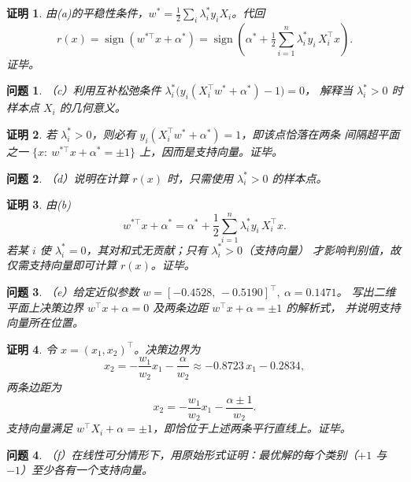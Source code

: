 \documentclass[11pt]{ctexart}
\newtheorem{problem}{问题}
\newtheorem*{solution}{证明}
\begin{document}
\begin{solution}
由(a)的平稳性条件，$w^{*}=\tfrac12\sum_i\lambda_i^{*} y_i X_i$。代回
\[
r(x)=\operatorname{sign}(w^{*\top}x+\alpha^{*})
=\operatorname{sign}\!\left(\alpha^{*}+\tfrac12\sum_{i=1}^n \lambda_i^{*} y_i\,X_i^\top x\right).
\]
证毕。
\end{solution}

\begin{problem}
（c）利用互补松弛条件 $\lambda_i^{*}\big(y_i(X_i^\top w^{*}+\alpha^{*})-1\big)=0$，
解释当 $\lambda_i^{*}>0$ 时样本点 $X_i$ 的几何意义。
\end{problem}

\begin{solution}
若 $\lambda_i^{*}>0$，则必有 $y_i(X_i^\top w^{*}+\alpha^{*})=1$，即该点恰落在两条
间隔超平面之一 $\{x:\ w^{*\top}x+\alpha^{*}=\pm 1\}$ 上，因而是支持向量。证毕。
\end{solution}

\begin{problem}
（d）说明在计算 $r(x)$ 时，只需使用 $\lambda_i^{*}>0$ 的样本点。
\end{problem}

\begin{solution}
由(b)
\[
w^{*\top}x+\alpha^{*}=\alpha^{*}+\frac12\sum_{i=1}^n\lambda_i^{*} y_i\,X_i^\top x.
\]
若某 $i$ 使 $\lambda_i^{*}=0$，其对和式无贡献；只有 $\lambda_i^{*}>0$（支持向量）
才影响判别值，故仅需支持向量即可计算 $r(x)$。证毕。
\end{solution}

\begin{problem}
（e）给定近似参数 $w=[-0.4528,\,-0.5190]^\top,\ \alpha=0.1471$。
写出二维平面上决策边界 $w^\top x+\alpha=0$ 及两条边距 $w^\top x+\alpha=\pm 1$ 的解析式，
并说明支持向量所在位置。
\end{problem}

\begin{solution}
令 $x=(x_1,x_2)^\top$。决策边界为
\[
x_2=-\frac{w_1}{w_2}x_1-\frac{\alpha}{w_2}\approx -0.8723\,x_1-0.2834,
\]
两条边距为
\[
x_2=-\frac{w_1}{w_2}x_1-\frac{\alpha\pm 1}{w_2}.
\]
支持向量满足 $w^\top X_i+\alpha=\pm 1$，即恰位于上述两条平行直线上。证毕。
\end{solution}

\begin{problem}
（f）在线性可分情形下，用原始形式证明：最优解的每个类别（$+1$ 与 $-1$）至少各有一个支持向量。
\end{problem}
\end{document}
